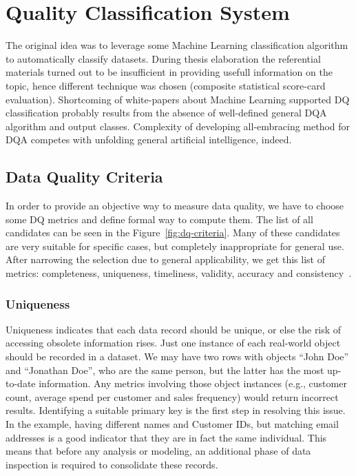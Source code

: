 \chapter{Quality Classification System}\label{ch:quality-classification-system}

The original idea was to leverage some Machine Learning classification algorithm to automatically classify datasets.
During thesis elaboration the referential materials turned out to be insufficient in providing usefull information on the topic, hence different technique was chosen (composite statistical score-card evaluation).
Shortcoming of white-papers about Machine Learning supported DQ classification probably results from the absence of well-defined general DQA algorithm and output classes.
Complexity of developing all-embracing method for DQA competes with unfolding general artificial intelligence, indeed.

\section{Data Quality Criteria}


In order to provide an objective way to measure data quality, we have to choose some DQ metrics and define formal way to compute them.
The list of all candidates can be seen in the Figure~\ref{fig:dq-criteria}.
Many of these candidates are very suitable for specific cases, but completely inappropriate for general use.
After narrowing the selection due to general applicability, we get this list of metrics: completeness, uniqueness, timeliness, validity, accuracy and consistency~\cite{ehdi2019}.

\subsection{Uniqueness}

Uniqueness indicates that each data record should be unique, or else the risk of accessing obsolete information rises.
Just one instance of each real-world object should be recorded in a dataset.
We may have two rows with objects \enquote{John Doe} and \enquote{Jonathan Doe}, who are the same person, but the latter has the most up-to-date information.
Any metrics involving those object instances (e.g., customer count, average spend per customer and sales frequency) would return incorrect results.
Identifying a suitable primary key is the first step in resolving this issue.
In the example, having different names and Customer IDs, but matching email addresses is a good indicator that they are in fact the same individual.
This means that before any analysis or modeling, an additional phase of data inspection is required to consolidate these records.

